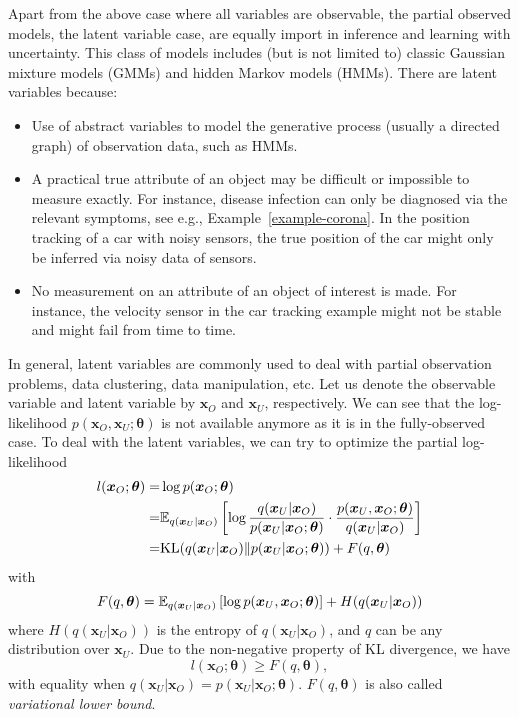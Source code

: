 Apart from the above case where all variables are observable, the partial observed models, the latent variable case, are equally import in inference and learning with uncertainty. This class of models includes (but is not limited to) classic Gaussian mixture models (GMMs) and hidden Markov models (HMMs). There are latent variables because:
\begin{itemize}
\item Use of abstract variables to model the generative process (usually a directed graph) of observation data, such as HMMs.
\item A practical true attribute of an object may be difficult or impossible to measure exactly. For instance, disease infection can only be diagnosed via the relevant symptoms, see e.g., Example~\ref{example-corona}. In the position tracking of a car with noisy sensors, the true position of the car might only be inferred via noisy data of sensors.
\item No measurement on an attribute of an object of interest is made. For instance, the velocity sensor in the car tracking example might not be stable and might fail from time to time.
\end{itemize}
In general, latent variables are commonly used to deal with partial observation problems, data clustering, data manipulation, etc. Let us denote the observable variable and latent variable by $\bm{x}_O$ and $\bm{x}_U$, respectively. We can see that the log-likelihood $p(\bm{x}_O, \bm{x}_U; \bm{\theta})$ is not available anymore as it is in the fully-observed case. To deal with the latent variables, we can try to optimize the partial log-likelihood
\begin{align}
  l(\bm{x}_O; \bm{\theta}) =& \log{p(\bm{x}_O; \bm{\theta})} \nonumber \\  
  = & \mathbb{E}_{q(\bm{x}_U|\bm{x}_O)}\left[ \log{\frac{q(\bm{x}_U|\bm{x}_O)}{p(\bm{x}_U|\bm{x}_O;\bm{\theta})} \cdot \frac{p(\bm{x}_U,\bm{x}_O;\bm{\theta})}{q(\bm{x}_U|\bm{x}_O)}} \right] \nonumber \\
  = & \mathrm{KL}(q(\bm{x}_U|\bm{x}_O)\|p(\bm{x}_U|\bm{x}_O;\bm{\theta})) + F(q, \bm{\theta})
\end{align}
with
\begin{equation}\label{chpt2:eq:llk-lower-bound}
  F(q, \bm{\theta}) = \mathbb{E}_{q(\bm{x}_U|\bm{x}_O)}\left[ \log{p(\bm{x}_U,\bm{x}_O;\bm{\theta})} \right] + H(q(\bm{x}_U|\bm{x}_O))
\end{equation}
where $H(q(\bm{x}_U|\bm{x}_O))$ is the entropy of $q(\bm{x}_U|\bm{x}_O)$, and $q$ can be any distribution over $\bm{x}_U$. Due to the non-negative property of KL divergence, we have
\begin{equation}
  l(\bm{x}_O; \bm{\theta}) \geq F(q, \bm{\theta}),
\end{equation}
with equality when $q(\bm{x}_U|\bm{x}_O) = p(\bm{x}_U|\bm{x}_O; \bm{\theta})$. $F(q, \bm{\theta})$ is also called \textit{variational lower bound}.

